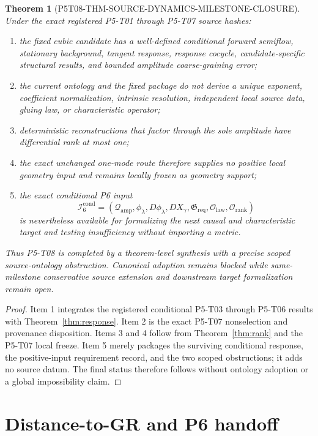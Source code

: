 \documentclass[11pt]{article}
\newtheorem{theorem}{Theorem}
\newcommand{\Qamp}{\mathcal Q_{\mathrm{amp}}}
\begin{document}
\begin{theorem}[P5T08-THM-SOURCE-DYNAMICS-MILESTONE-CLOSURE]
\label{thm:closure}
Under the exact registered P5-T01 through P5-T07 source hashes:
\begin{enumerate}
  \item the fixed cubic candidate has a well-defined conditional forward
  semiflow, stationary background, tangent response, response cocycle,
  candidate-specific structural results, and bounded amplitude
  coarse-graining error;
  \item the current ontology and the fixed package do not derive a unique
  exponent, coefficient normalization, intrinsic resolution, independent
  local source data, gluing law, or characteristic operator;
  \item deterministic reconstructions that factor through the sole amplitude
  have differential rank at most one;
  \item the exact unchanged one-mode route therefore supplies no positive
  local geometry input and remains locally frozen as geometry support;
  \item the exact conditional P6 input
  \[
    \mathcal I^{\mathrm{cond}}_6
      =(\Qamp,\phi_\lambda,D\phi_\lambda,DX_\gamma,
        \mathfrak G_{\mathrm{req}},
        \mathcal O_{\mathrm{law}},
        \mathcal O_{\mathrm{rank}})
  \]
  is nevertheless available for formalizing the next causal and
  characteristic target and testing insufficiency without importing a
  metric.
\end{enumerate}
Thus P5-T08 is completed by a theorem-level synthesis with a precise scoped
source-ontology obstruction.  Canonical adoption remains blocked while
same-milestone conservative source extension and downstream target
formalization remain open.
\end{theorem}

\begin{proof}
Item 1 integrates the registered conditional P5-T03 through P5-T06 results
with Theorem~\ref{thm:response}.  Item 2 is the exact P5-T07 nonselection and
provenance disposition.  Items 3 and 4 follow from
Theorem~\ref{thm:rank} and the P5-T07 local freeze.  Item 5 merely packages
the surviving conditional response, the positive-input requirement record,
and the two scoped obstructions; it adds no source datum.  The final status
therefore follows without ontology adoption or a global impossibility claim.
\end{proof}

\section{Distance-to-GR and P6 handoff}
\end{document}
